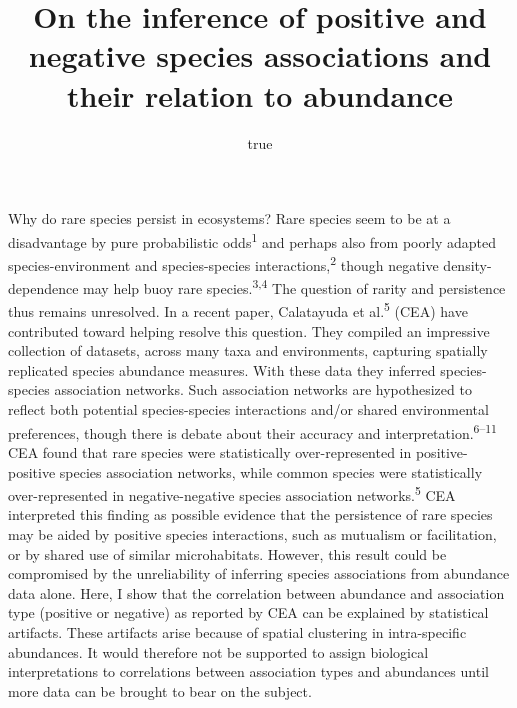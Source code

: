 \documentclass[
]{article}
\title{On the inference of positive and negative species associations
and their relation to abundance}
\author{true}
\date{}
\begin{document}
\maketitle

Why do rare species persist in ecosystems? Rare species seem to be at a
disadvantage by pure probabilistic odds\textsuperscript{1} and perhaps
also from poorly adapted species-environment and species-species
interactions,\textsuperscript{2} though negative density-dependence may
help buoy rare species.\textsuperscript{3,4} The question of rarity and
persistence thus remains unresolved. In a recent paper, Calatayuda et
al.\textsuperscript{5} (CEA) have contributed toward helping resolve
this question. They compiled an impressive collection of datasets,
across many taxa and environments, capturing spatially replicated
species abundance measures. With these data they inferred
species-species association networks. Such association networks are
hypothesized to reflect both potential species-species interactions
and/or shared environmental preferences, though there is debate about
their accuracy and interpretation.\textsuperscript{6--11} CEA found that
rare species were statistically over-represented in positive-positive
species association networks, while common species were statistically
over-represented in negative-negative species association
networks.\textsuperscript{5} CEA interpreted this finding as possible
evidence that the persistence of rare species may be aided by positive
species interactions, such as mutualism or facilitation, or by shared
use of similar microhabitats. However, this result could be compromised
by the unreliability of inferring species associations from abundance
data alone. Here, I show that the correlation between abundance and
association type (positive or negative) as reported by CEA can be
explained by statistical artifacts. These artifacts arise because of
spatial clustering in intra-specific abundances. It would therefore not
be supported to assign biological interpretations to correlations
between association types and abundances until more data can be brought
to bear on the subject.
\end{document}
